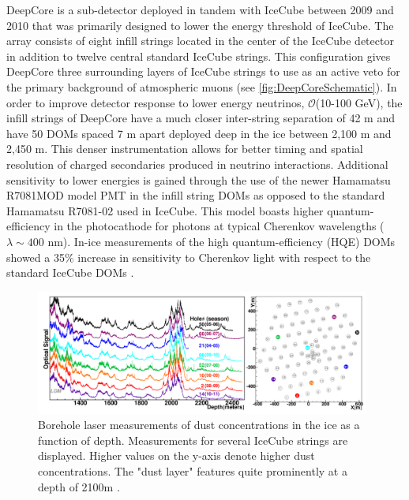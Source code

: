 \documentclass{gatech-thesis}
\begin{document}
DeepCore \cite{2012APh....35..615A} is a sub-detector deployed in tandem with IceCube between 2009 and 2010 that was primarily designed to lower the energy threshold of IceCube. The array consists of eight infill strings located in the center of the IceCube detector in addition to twelve central standard IceCube strings. This configuration gives DeepCore three surrounding layers of IceCube strings to use as an active veto for the primary background of atmospheric muons (see \ref{fig:DeepCoreSchematic}). In order to improve detector response to lower energy neutrinos, $\mathcal{O}$(10-100 GeV), the infill strings of DeepCore have a much closer inter-string separation of 42 m and have 50 DOMs spaced 7 m apart deployed deep in the ice between 2,100 m and 2,450 m. This denser instrumentation allows for better timing and spatial resolution of charged secondaries produced in neutrino interactions. Additional sensitivity to lower energies is gained through the use of the newer Hamamatsu R7081MOD model PMT in the infill string DOMs as opposed to the standard Hamamatsu R7081-02 used in IceCube. This model boasts higher quantum-efficiency in the photocathode for photons at typical Cherenkov wavelengths ($\lambda \sim 400$ nm). In-ice measurements of the high quantum-efficiency (HQE) DOMs showed a 35$\%$ increase in sensitivity to Cherenkov light with respect to the standard IceCube DOMs \cite{2012APh....35..615A}.

\begin{figure}[ht]
  \begin{center}
    \includegraphics[width=0.98\textwidth,keepaspectratio]{BoreholeLaserDustLogging.png}
  \end{center}
  \caption{Borehole laser measurements of dust concentrations in the ice as a function of depth. Measurements for several IceCube strings are displayed. Higher values on the y-axis denote higher dust concentrations. The "dust layer" features quite prominently at a depth of 2100m \cite{2013JGlac..59.1117.}.}
  \label{fig:DustLogger}
\end{figure}
\end{document}
